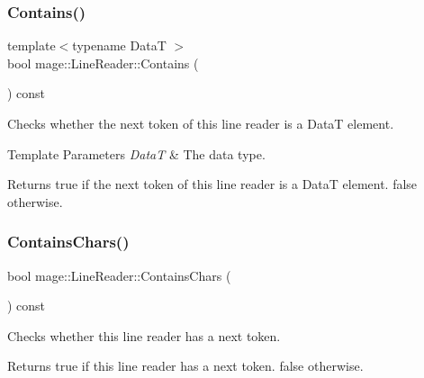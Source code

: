 \subsubsection{\texorpdfstring{Contains()}{Contains()}}
{\footnotesize\ttfamily template$<$typename DataT $>$ \\
bool mage\+::\+Line\+Reader\+::\+Contains (\begin{DoxyParamCaption}{ }\end{DoxyParamCaption}) const\hspace{0.3cm}{\ttfamily [protected]}}

Checks whether the next token of this line reader is a {\ttfamily DataT} element.


\begin{DoxyTemplParams}{Template Parameters}
{\em DataT} & The data type. \\
\hline
\end{DoxyTemplParams}
\begin{DoxyReturn}{Returns}
{\ttfamily true} if the next token of this line reader is a {\ttfamily DataT} element. {\ttfamily false} otherwise. 
\end{DoxyReturn}
\hypertarget{classmage_1_1_line_reader_a0369e06fa3b38ecb22ffd5892759225f}{}\label{classmage_1_1_line_reader_a0369e06fa3b38ecb22ffd5892759225f} 
\subsubsection{\texorpdfstring{Contains\+Chars()}{ContainsChars()}}
{\footnotesize\ttfamily bool mage\+::\+Line\+Reader\+::\+Contains\+Chars (\begin{DoxyParamCaption}{ }\end{DoxyParamCaption}) const\hspace{0.3cm}{\ttfamily [protected]}}

Checks whether this line reader has a next token.

\begin{DoxyReturn}{Returns}
{\ttfamily true} if this line reader has a next token. {\ttfamily false} otherwise. 
\end{DoxyReturn}
\hypertarget{classmage_1_1_line_reader_a99b4fa47fc341ad4fda112ea9505efcb}{}\label{classmage_1_1_line_reader_a99b4fa47fc341ad4fda112ea9505efcb} 
